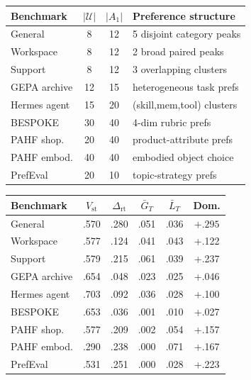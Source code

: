 \documentclass{article} %
\begin{document}
\begin{table}[t]
\centering
\small
\begin{minipage}{0.48\textwidth}
\centering
\begin{tabular}{lccl}
\toprule
\textbf{Benchmark} & $|\mathcal{U}|$ & $|A_1|$ & Preference structure \\
\midrule
General       &  8 & 12 & 5 disjoint category peaks \\
Workspace     &  8 & 12 & 2 broad paired peaks \\
Support       &  8 & 12 & 3 overlapping clusters \\
GEPA archive  & 12 & 15 & heterogeneous task prefs \\
Hermes agent  & 15 & 20 & (skill,mem,tool) clusters \\
BESPOKE       & 30 & 40 & 4-dim rubric prefs \\
PAHF shop.    & 20 & 40 & product-attribute prefs \\
PAHF embod.   & 40 & 40 & embodied object choice \\
PrefEval      & 20 & 10 & topic-strategy prefs \\
\bottomrule
\end{tabular}
\label{tab:envs}
\end{minipage}
\hfill
\begin{minipage}{0.50\textwidth}
\centering
\begin{tabular}{lccccc}
\toprule
\textbf{Benchmark} & $V_{\mathrm{st}}$ & $\Delta_{\mathrm{rt}}$ & $\bar G_T$ & $\bar L_T$ & \textbf{Dom.} \\
\midrule
General       & .570 & .280 & .051 & .036 & $\mathbf{+.295}$ \\
Workspace     & .577 & .124 & .041 & .043 & +.122 \\
Support       & .579 & .215 & .061 & .039 & +.237 \\
GEPA archive  & .654 & .048 & .023 & .025 & +.046 \\
Hermes agent  & .703 & .092 & .036 & .028 & +.100 \\
BESPOKE       & .653 & .036 & .001 & .010 & +.027 \\
PAHF shop.    & .577 & .209 & .002 & .054 & +.157 \\
PAHF embod.   & .290 & .238 & .000 & .071 & +.167 \\
PrefEval      & .531 & .251 & .000 & .028 & +.223 \\
\bottomrule
\end{tabular}
\label{tab:main}\label{tab:e6-decomp}
\end{minipage}
\end{table}
\end{document}
